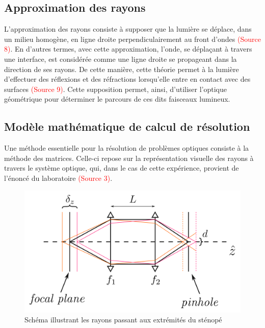 \documentclass[11pt,letterpaper]{article}
\begin{document}


\subsection{Approximation des rayons}
L'approximation des rayons consiste à supposer que la lumière se déplace, dans un milieu homogène, en ligne droite perpendiculairement au front d'ondes \textcolor{red}{(Source 8)}. En d'autres termes, avec cette approximation, l'onde, se déplaçant à travers une interface, est considérée comme une ligne droite se propageant dans la direction de ses rayons. De cette manière, cette théorie permet à la lumière d'effectuer des réflexions et des réfractions lorsqu'elle entre en contact avec des surfaces \textcolor{red}{(Source 9)}. Cette supposition permet, ainsi, d'utiliser l'optique géométrique pour déterminer le parcours de ces dits faisceaux lumineux. 


\subsection{Modèle mathématique de calcul de résolution}
Une méthode essentielle pour la résolution de problèmes optiques consiste à la méthode des matrices. Celle-ci repose sur la représentation visuelle des rayons à travers le système optique, qui, dans le cas de cette expérience, provient de l'énoncé du laboratoire \textcolor{red}{(Source 3)}.
\begin{figure}[H]
  \centering
  \includegraphics[scale=0.15]{rayons_pinhole.png}
  \caption{Schéma illustrant les rayons passant aux extrémités du sténopé}
  \label{rayons}
\end{figure}
\end{document}
